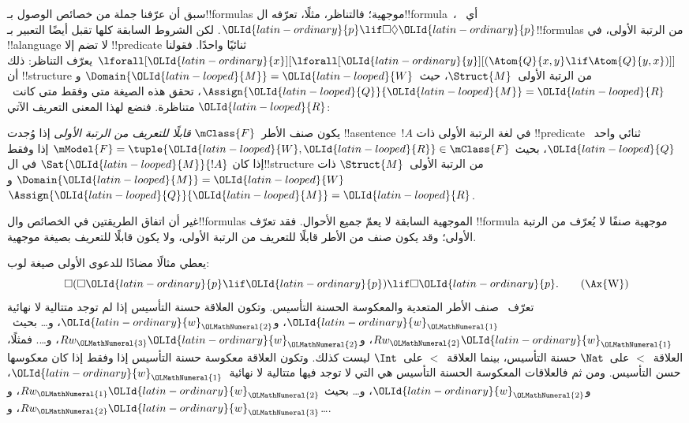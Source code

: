 \documentclass[../../../include/open-logic-section]{subfiles}
\begin{document}


سبق أن عرّفنا جملة من خصائص الوصول بـ!!{formula}s موجهية؛
فالتناظر، مثلًا، تعرّفه ال!!{formula}~، أي~$\OLId{latin-ordinary}{p} \lif \Box\Diamond \OLId{latin-ordinary}{p}$.
لكن الشروط السابقة كلها تقبل أيضًا التعبير بـ!!{formula}s من
الرتبة الأولى، في !!a{language} لا تضم إلا !!{predicate} ثنائيًا
واحدًا. فقولنا
$\lforall[\OLId{latin-ordinary}{x}][\lforall[\OLId{latin-ordinary}{y}][(\Atom{Q}{x,y} \lif \Atom{Q}{y, x})]]$
يعرّف التناظر: ذلك أن !!{structure} من الرتبة الأولى~$\Struct{M}$،
حيث~$\Domain{\OLId{latin-looped}{M}} = \OLId{latin-looped}{W}$ و$\Assign{\OLId{latin-looped}{Q}}{\OLId{latin-looped}{M}} = \OLId{latin-looped}{R}$، تحقق هذه الصيغة
متى وفقط متى كانت~$\OLId{latin-looped}{R}$ متناظرة. فنضع لهذا المعنى التعريف الآتي:

\begin{defn}
  يكون صنف الأطر~$\mClass{F}$ \emph{قابلًا للتعريف من الرتبة الأولى}
  إذا وُجدت !!a{sentence}~$!A$ في لغة الرتبة الأولى ذات
  !!{predicate} ثنائي واحد~$\OLId{latin-looped}{Q}$، بحيث
  $\mModel{F} = \tuple{\OLId{latin-looped}{W}, \OLId{latin-looped}{R}} \in \mClass{F}$ إذا وفقط إذا كان
  $\Sat{\OLId{latin-looped}{M}}{!A}$ في ال!!{structure} من الرتبة الأولى~$\Struct{M}$ ذات
  $\Domain{\OLId{latin-looped}{M}} = \OLId{latin-looped}{W}$ و$\Assign{\OLId{latin-looped}{Q}}{\OLId{latin-looped}{M}} = \OLId{latin-looped}{R}$.
\end{defn}

غير أن اتفاق الطريقتين في الخصائص وال!!{formula}s الموجهية
السابقة لا يعمّ جميع الأحوال. فقد تعرّف !!{formula} موجهية صنفًا
لا يُعرّف من الرتبة الأولى؛ وقد يكون صنف من الأطر قابلًا للتعريف
من الرتبة الأولى، ولا يكون قابلًا للتعريف بصيغة موجهية.

يعطي مثالًا مضادًا للدعوى الأولى صيغة لوب:
\begin{equation}
\Box(\Box \OLId{latin-ordinary}{p} \lif \OLId{latin-ordinary}{p}) \lif \Box \OLId{latin-ordinary}{p}. \tag{\Ax{W}}
\end{equation}
تعرّف~ صنف الأطر المتعدية والمعكوسة الحسنة التأسيس. وتكون
العلاقة حسنة التأسيس إذا لم توجد متتالية لا نهائية
$\OLId{latin-ordinary}{w}_\OLMathNumeral{1}$، و$\OLId{latin-ordinary}{w}_\OLMathNumeral{2}$، و\dots{} بحيث~$Rw_\OLMathNumeral{2}\OLId{latin-ordinary}{w}_\OLMathNumeral{1}$، و$Rw_\OLMathNumeral{3}\OLId{latin-ordinary}{w}_\OLMathNumeral{2}$، و\dots. فمثلًا،
العلاقة~$<$ على~$\Nat$ حسنة التأسيس، بينما العلاقة~$<$ على~$\Int$
ليست كذلك. وتكون العلاقة معكوسة حسنة التأسيس إذا وفقط إذا كان
معكوسها حسن التأسيس. ومن ثم فالعلاقات المعكوسة الحسنة التأسيس هي التي
لا توجد فيها متتالية لا نهائية~$\OLId{latin-ordinary}{w}_\OLMathNumeral{1}$، و$\OLId{latin-ordinary}{w}_\OLMathNumeral{2}$، و\dots{} بحيث
$Rw_\OLMathNumeral{1}\OLId{latin-ordinary}{w}_\OLMathNumeral{2}$، و$Rw_\OLMathNumeral{2}\OLId{latin-ordinary}{w}_\OLMathNumeral{3}$، و\dots.
\end{document}
